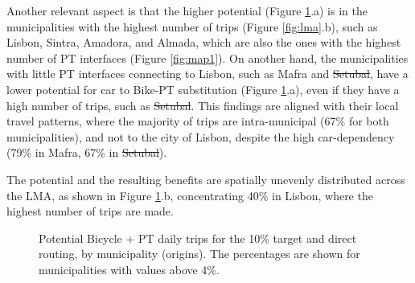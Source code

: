 \documentclass[review, doubleblind, 3p,
authoryear]{elsarticle} %
\providecommand{\DIFaddtex}[1]{{\protect\color{blue}\uwave{#1}}} %
\providecommand{\DIFdeltex}[1]{{\protect\color{red}\sout{#1}}}                      %
\providecommand{\DIFaddbegin}{} %
\providecommand{\DIFaddend}{} %
\providecommand{\DIFdelbegin}{} %
\providecommand{\DIFdelend}{} %
\providecommand{\DIFaddbeginFL}{} %
\providecommand{\DIFaddendFL}{} %
\providecommand{\DIFdelbeginFL}{} %
\providecommand{\DIFdelendFL}{} %
\providecommand{\DIFadd}[1]{\texorpdfstring{\DIFaddtex{#1}}{#1}} %
\providecommand{\DIFdel}[1]{\texorpdfstring{\DIFdeltex{#1}}{}} %
\newcommand{\DIFscaledelfig}{0.5}
\newlength{\DIFdelgraphicswidth} %
\newlength{\DIFdelgraphicsheight} %
\newcommand{\DIFaddincludegraphics}[2][]{{\color{blue}\fbox{\DIFOincludegraphics[#1]{#2}}}} %
\newcommand{\DIFdelincludegraphics}[2][]{%
\sbox{\DIFdelgraphicsbox}{\DIFOincludegraphics[#1]{#2}}%
\settoboxwidth{\DIFdelgraphicswidth}{\DIFdelgraphicsbox} %
\settoboxtotalheight{\DIFdelgraphicsheight}{\DIFdelgraphicsbox} %
\scalebox{\DIFscaledelfig}{%
\parbox[b]{\DIFdelgraphicswidth}{\usebox{\DIFdelgraphicsbox}\\[-\baselineskip] \rule{\DIFdelgraphicswidth}{0em}}\llap{\resizebox{\DIFdelgraphicswidth}{\DIFdelgraphicsheight}{%
\setlength{\unitlength}{\DIFdelgraphicswidth}%
\begin{picture}(1,1)%
\thicklines\linethickness{2pt} %
{\color[rgb]{1,0,0}\put(0,0){\framebox(1,1){}}}%
{\color[rgb]{1,0,0}\put(0,0){\line( 1,1){1}}}%
{\color[rgb]{1,0,0}\put(0,1){\line(1,-1){1}}}%
\end{picture}%
}\hspace*{3pt}}} %
} %
\DeclareRobustCommand{\DIFaddbegin}{\DIFOaddbegin \let\includegraphics\DIFaddincludegraphics} %
\DeclareRobustCommand{\DIFaddend}{\DIFOaddend \let\includegraphics\DIFOincludegraphics} %
\DeclareRobustCommand{\DIFdelbegin}{\DIFOdelbegin \let\includegraphics\DIFdelincludegraphics} %
\DeclareRobustCommand{\DIFdelend}{\DIFOaddend \let\includegraphics\DIFOincludegraphics} %
\DeclareRobustCommand{\DIFaddbeginFL}{\DIFOaddbeginFL \let\includegraphics\DIFaddincludegraphics} %
\DeclareRobustCommand{\DIFaddendFL}{\DIFOaddendFL \let\includegraphics\DIFOincludegraphics} %
\DeclareRobustCommand{\DIFdelbeginFL}{\DIFOdelbeginFL \let\includegraphics\DIFdelincludegraphics} %
\DeclareRobustCommand{\DIFdelendFL}{\DIFOaddendFL \let\includegraphics\DIFOincludegraphics} %
\begin{document}
\DIFaddend Another relevant aspect is that the higher potential (Figure
\ref{fig:mapzones}.a) is in the municipalities with the highest number
of trips (Figure \ref{fig:lma}.b), such as Lisbon, Sintra, Amadora, and
Almada, which are also the ones with the highest number of PT interfaces
(Figure \ref{fig:map1}). On another hand, the municipalities with little
PT interfaces connecting to Lisbon, such as Mafra and \DIFdelbegin \DIFdel{Setubal}\DIFdelend \DIFaddbegin \DIFadd{Setúbal}\DIFaddend , have a
lower potential for car to Bike-PT substitution (Figure
\ref{fig:mapzones}.a), even if they have a high number of trips, such as
\DIFdelbegin \DIFdel{Setubal}\DIFdelend \DIFaddbegin \DIFadd{Setúbal}\DIFaddend . This findings are aligned with their local travel patterns,
where the majority of trips are intra-municipal (67\% for both
municipalities), and not to the city of Lisbon, despite the high
car-dependency (79\% in Mafra, 67\% in \DIFdelbegin \DIFdel{Setubal}\DIFdelend \DIFaddbegin \DIFadd{Setúbal}\DIFaddend ).

The potential and the resulting benefits are spatially unevenly
distributed across the LMA, as shown in Figure \ref{fig:mapzones}.b,
concentrating 40\% in Lisbon, where the highest number of trips are
made.

\begin{figure}
\DIFdelbeginFL %
\DIFdelendFL \DIFaddbeginFL {}\DIFaddendFL \caption{\label{mapzones}Potential Bicycle + PT daily trips for the 10\% target and direct routing, by municipality (origins). The percentages are shown for municipalities with values above 4\%.}\label{fig:mapzones}
\end{figure}
\end{document}
